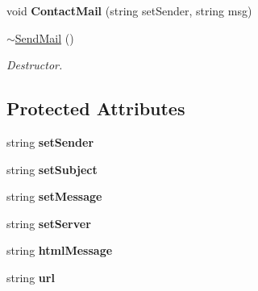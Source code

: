 \begin{DoxyCompactItemize}
\item 
\hypertarget{classSendMail_a3d918a3f54b3a9be68fe732e9d5de43f}{void {\bfseries Contact\-Mail} (string set\-Sender, string msg)}\label{classSendMail_a3d918a3f54b3a9be68fe732e9d5de43f}

\item 
\hypertarget{classSendMail_acc86b2a9995472436dbd77b3c6bb91f3}{\hyperlink{classSendMail_acc86b2a9995472436dbd77b3c6bb91f3}{$\sim$\-Send\-Mail} ()}\label{classSendMail_acc86b2a9995472436dbd77b3c6bb91f3}

\begin{DoxyCompactList}\small\item\em Destructor. \end{DoxyCompactList}\end{DoxyCompactItemize}
\subsection*{Protected Attributes}
\begin{DoxyCompactItemize}
\item 
\hypertarget{classSendMail_ae6776dfd1b92b97837f25259f7b57d2f}{string {\bfseries set\-Sender}}\label{classSendMail_ae6776dfd1b92b97837f25259f7b57d2f}

\item 
\hypertarget{classSendMail_a22e32135e60ad02a6beff91638907cc6}{string {\bfseries set\-Subject}}\label{classSendMail_a22e32135e60ad02a6beff91638907cc6}

\item 
\hypertarget{classSendMail_ac4e386f1e7775484429f7b01ef1623a3}{string {\bfseries set\-Message}}\label{classSendMail_ac4e386f1e7775484429f7b01ef1623a3}

\item 
\hypertarget{classSendMail_a5337895c22cda4db5ebd05e43925e391}{string {\bfseries set\-Server}}\label{classSendMail_a5337895c22cda4db5ebd05e43925e391}

\item 
\hypertarget{classSendMail_a962ca34d61eab5c0f8c47e760cce4a53}{string {\bfseries html\-Message}}\label{classSendMail_a962ca34d61eab5c0f8c47e760cce4a53}

\item 
\hypertarget{classSendMail_a6b02c708619c2fb35216b2ee3061f33b}{string {\bfseries url}}\label{classSendMail_a6b02c708619c2fb35216b2ee3061f33b}

\end{DoxyCompactItemize}



